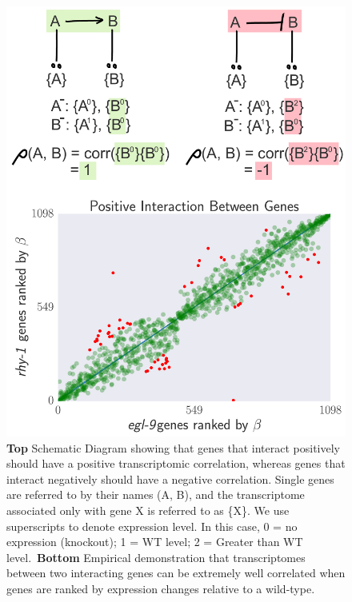 \documentclass[9pt,twocolumn,twoside]{pnas-new}
\begin{document}
\begin{figure}%
\centering
\includegraphics[width=0.85\linewidth]{figs/correlative_genetics.pdf}
\caption{\textbf{Top} Schematic Diagram showing that genes that interact positively should have a positive transcriptomic correlation, whereas genes that interact negatively should have a negative correlation. Single genes are referred to by their names (A, B), and the transcriptome associated only with gene X is referred to as \{X\}. We use superscripts to denote expression level. In this case, 0 = no expression (knockout); 1 = WT level; 2 = Greater than WT level.\ \textbf{Bottom} Empirical demonstration that transcriptomes between two interacting genes can be extremely well correlated when genes are ranked by expression changes relative to a wild-type.}
\label{fig:genetic_interactions}
\end{figure}
\end{document}
